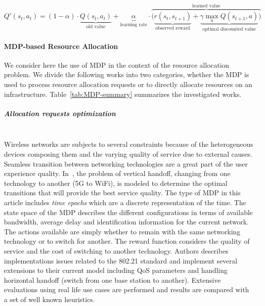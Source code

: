 \begin{equation}\label{eq:updatingq}
Q'(s_{t},a_{t}) = (1-\alpha) \cdot \underbrace{Q(s_{t},a_{t})}_{\text{old value}} + \underbrace{\alpha}_{\text{learning rate}} \cdot  \overbrace{\bigg( \underbrace{r(s_t,s_{t+1})}_{\text{observed reward}} + \underbrace{\gamma \max_{a}Q(s_{t+1}, a)}_{\text{optimal discounted value}} \bigg) }^{\text{learned value}}
\end{equation}



\paragraph{MDP-based Resource Allocation}
\textbf{\newline}
We consider here the use of MDP in the context of the resource allocation problem.
We divide the following works into two categories, whether the MDP is used to process resource allocation requests or to directly allocate resources on an infrastructure.
Table~\ref{tab:MDP-summary} summarizes the investigated works.

\subparagraph{Allocation requests optimization}
\textbf{\\}
Wireless networks are subjects to several constraints because of the heterogeneous devices composing them and the varying quality of service due to external causes. Seamless transition between networking technologies are a great part of the user experience quality. In~\cite{navarro2008}, the problem of vertical handoff, \ie changing from one technology to another (\eg 5G to WiFi), is modeled to determine the optimal transitions that will provide the best service quality. 
The type of MDP in this article includes \textit{time epochs} which are a discrete representation of the time.
The state space of the MDP describes the different configurations in terms of available bandwidth, average delay and identification information for the current network.
The actions available are simply whether to remain with the same networking technology or to switch for another. The reward function considers the quality of service and the cost of switching to another technology.
Authors describes implementations issues related to the 802.21 standard and implement several extensions to their current model including QoS parameters and handling horizontal handoff (\ie switch from one base station to another).
Extensive evaluations using real life use cases are performed and results are compared with a set of well known heuristics.

